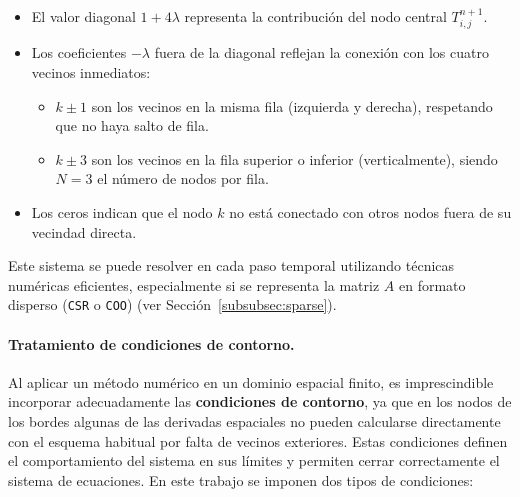 \documentclass{article}
\begin{document}
\begin{itemize}
    \item El valor diagonal $1 + 4\lambda$ representa la contribución del nodo central $T_{i,j}^{n+1}$.
    \item Los coeficientes $-\lambda$ fuera de la diagonal reflejan la conexión con los cuatro vecinos inmediatos:
    \begin{itemize}
        \item $k \pm 1$ son los vecinos en la misma fila (izquierda y derecha), respetando que no haya salto de fila.
        \item $k \pm 3$ son los vecinos en la fila superior o inferior (verticalmente), siendo $N = 3$ el número de nodos por fila.
    \end{itemize}
    \item Los ceros indican que el nodo $k$ no está conectado con otros nodos fuera de su vecindad directa.
\end{itemize}
Este sistema se puede resolver en cada paso temporal utilizando técnicas numéricas eficientes, especialmente si se representa la matriz $A$ en formato disperso (\texttt{CSR} o \texttt{COO}) (ver Sección~\ref{subsubsec:sparse}).

\paragraph{Tratamiento de condiciones de contorno.} Al aplicar un método numérico en un dominio espacial finito, es imprescindible incorporar adecuadamente las \textbf{condiciones de contorno}, ya que en los nodos de los bordes algunas de las derivadas espaciales no pueden calcularse directamente con el esquema habitual por falta de vecinos exteriores. Estas condiciones definen el comportamiento del sistema en sus límites y permiten cerrar correctamente el sistema de ecuaciones. En este trabajo se imponen dos tipos de condiciones:
\end{document}
